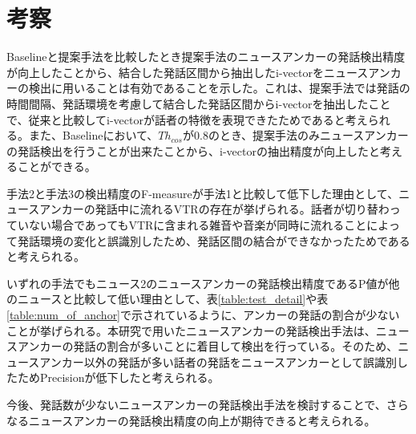 \section{考察}
Baselineと提案手法を比較したとき提案手法のニュースアンカーの発話検出精度が向上したことから、結合した発話区間から抽出したi-vectorをニュースアンカーの検出に用いることは有効であることを示した。これは、提案手法では発話の時間間隔、発話環境を考慮して結合した発話区間からi-vectorを抽出したことで、従来と比較してi-vectorが話者の特徴を表現できたためであると考えられる。また、Baselineにおいて、$Th_{cos}$が0.8のとき、提案手法のみニュースアンカーの発話検出を行うことが出来たことから、i-vectorの抽出精度が向上したと考えることができる。\par
手法2と手法3の検出精度のF-measureが手法1と比較して低下した理由として、ニュースアンカーの発話中に流れるVTRの存在が挙げられる。話者が切り替わっていない場合であってもVTRに含まれる雑音や音楽が同時に流れることによって発話環境の変化と誤識別したため、発話区間の結合ができなかったためであると考えられる。\par
いずれの手法でもニュース2のニュースアンカーの発話検出精度であるP値が他のニュースと比較して低い理由として、表\ref{table:test_detail}や表\ref{table:num_of_anchor}で示されているように、アンカーの発話の割合が少ないことが挙げられる。本研究で用いたニュースアンカーの発話検出手法\cite{nozaki_gakuseikai}は、ニュースアンカーの発話の割合が多いことに着目して検出を行っている。そのため、ニュースアンカー以外の発話が多い話者の発話をニュースアンカーとして誤識別したためPrecisionが低下したと考えられる。\par
今後、発話数が少ないニュースアンカーの発話検出手法を検討することで、さらなるニュースアンカーの発話検出精度の向上が期待できると考えられる。\par

